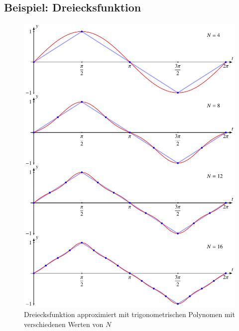 \subsection{Beispiel: Dreiecksfunktion}
\begin{figure}
\centering
\includegraphics{chapters/6/dreieck.pdf}
\caption{Dreiecksfunktion approximiert mit trigonometrischen Polynomen 
mit verschiedenen Werten von $N$
\label{skript:fourier:beispiel}}
\end{figure}
